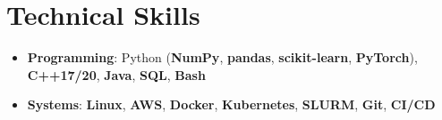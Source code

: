 \documentclass[letterpaper,10pt]{article}
\begin{document}
\section{Technical Skills}
\begin{itemize}[leftmargin=*,itemsep=-2pt,topsep=1pt]
  \item \textbf{Programming}: Python (\textbf{NumPy}, \textbf{pandas}, \textbf{scikit-learn}, \textbf{PyTorch}), \textbf{C++17/20}, \textbf{Java}, \textbf{SQL}, \textbf{Bash}
  \item \textbf{Systems}: \textbf{Linux}, \textbf{AWS}, \textbf{Docker}, \textbf{Kubernetes}, \textbf{SLURM}, \textbf{Git}, \textbf{CI/CD}
\end{itemize}
\end{document}
